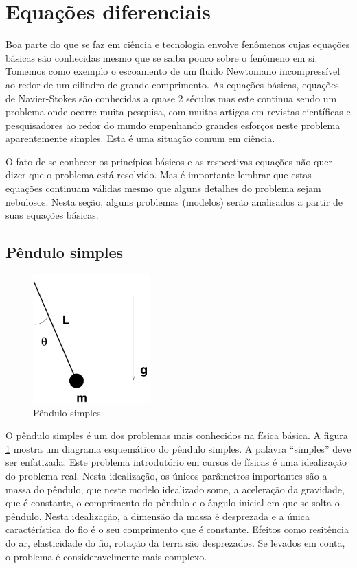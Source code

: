 \section{Equações diferenciais}
Boa parte do que se faz em ciência e tecnologia envolve fenômenos cujas equações básicas são conhecidas mesmo que se saiba pouco sobre o fenômeno em si. Tomemos como exemplo o escoamento de um fluido Newtoniano incompressível ao redor de um cilindro de grande comprimento. As equações básicas, equações de Navier-Stokes são conhecidas a quase 2 séculos mas este continua sendo um problema onde ocorre muita pesquisa, com muitos artigos em revistas científicas e pesquisadores ao redor do mundo empenhando grandes esforços neste problema aparentemente simples. Esta é uma situação comum em ciência. 

O fato de se conhecer os princípios básicos e as respectivas equações não quer dizer que o problema está resolvido. Mas é importante lembrar que estas equações continuam válidas mesmo que alguns detalhes do problema sejam nebulosos. Nesta seção, alguns problemas (modelos) serão analisados a partir de suas equações básicas.

\subsection{Pêndulo simples}

\begin{figure}
\centering
\includegraphics[width=0.4\textwidth]{./figuras/pendulo.pdf}
\vspace{0.5cm}
\caption{Pêndulo simples}
\label{fig:pendulo}
\end{figure}

O pêndulo simples é um dos problemas mais conhecidos na física básica. A figura \ref{fig:pendulo} mostra um diagrama esquemático do pêndulo simples. A palavra ``simples'' deve ser enfatizada. Este problema introdutório em cursos de físicas é uma idealização do problema real. Nesta idealização, os únicos parâmetros importantes são a massa do pêndulo, que neste modelo idealizado some, a aceleração da gravidade, que é constante, o comprimento do pêndulo e o ângulo inicial em que se solta o pêndulo. Nesta idealização, a dimensão da massa é desprezada e a única caractérística do fio é o seu comprimento que é constante. Efeitos como resitência do ar, elasticidade do fio, rotação da terra são desprezados. Se levados em conta, o problema é consideravelmente mais complexo. 

